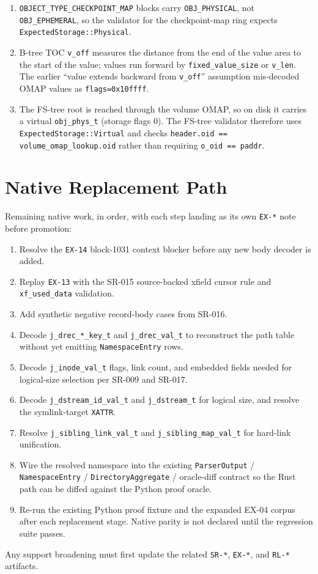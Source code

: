 \begin{enumerate}
  \item \texttt{OBJECT\_TYPE\_CHECKPOINT\_MAP} blocks carry \texttt{OBJ\_PHYSICAL},
  not \texttt{OBJ\_EPHEMERAL}, so the validator for the checkpoint-map ring
  expects \texttt{ExpectedStorage::Physical}.
  \item B-tree TOC \texttt{v\_off} measures the distance from the end of the
  value area to the start of the value; values run forward by
  \texttt{fixed\_value\_size} or \texttt{v\_len}. The earlier
  ``value extends backward from \texttt{v\_off}'' assumption mis-decoded OMAP
  values as \texttt{flags=0x10ffff}.
  \item The FS-tree root is reached through the volume OMAP, so on disk it
  carries a virtual \texttt{obj\_phys\_t} (storage flags 0). The FS-tree
  validator therefore uses \texttt{ExpectedStorage::Virtual} and checks
  \texttt{header.oid == volume\_omap\_lookup.oid} rather than requiring
  \texttt{o\_oid == paddr}.
\end{enumerate}

\section{Native Replacement Path}

Remaining native work, in order, with each step landing as its own
\texttt{EX-*} note before promotion:

\begin{enumerate}
  \item Resolve the \texttt{EX-14} block-1031 context blocker before any new
  body decoder is added.
  \item Replay \texttt{EX-13} with the SR-015 source-backed xfield cursor rule
  and \texttt{xf\_used\_data} validation.
  \item Add synthetic negative record-body cases from SR-016.
  \item Decode \texttt{j\_drec\_*\_key\_t} and \texttt{j\_drec\_val\_t} to
  reconstruct the path table without yet emitting \texttt{NamespaceEntry} rows.
  \item Decode \texttt{j\_inode\_val\_t} flags, link count, and embedded fields
  needed for logical-size selection per SR-009 and SR-017.
  \item Decode \texttt{j\_dstream\_id\_val\_t} and \texttt{j\_dstream\_t} for
  logical size, and resolve the symlink-target \texttt{XATTR}.
  \item Resolve \texttt{j\_sibling\_link\_val\_t} and
  \texttt{j\_sibling\_map\_val\_t} for hard-link unification.
  \item Wire the resolved namespace into the existing
  \texttt{ParserOutput} / \texttt{NamespaceEntry} / \texttt{DirectoryAggregate}
  / oracle-diff contract so the Rust path can be diffed against the Python
  proof oracle.
  \item Re-run the existing Python proof fixture and the expanded EX-04 corpus
  after each replacement stage. Native parity is not declared until the
  regression suite passes.
\end{enumerate}

Any support broadening must first update the related \texttt{SR-*},
\texttt{EX-*}, and \texttt{RL-*} artifacts.
